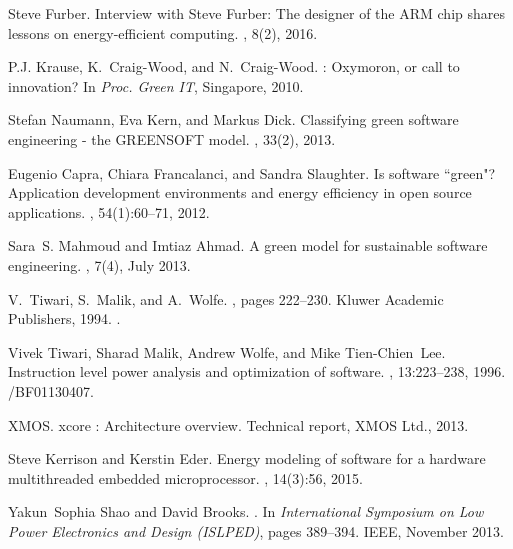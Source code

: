 \documentclass[oneside]{book}
\begin{document}

%
\begin{thebibliography}{10}

Steve Furber.
\newblock Interview with {S}teve {F}urber: The designer of the {ARM} chip
  shares lessons on energy-efficient computing.
, 8(2), 2016.

P.J. Krause, K.~Craig-Wood, and N.~Craig-Wood.
: {O}xymoron, or call to innovation?
\newblock In {\em Proc. Green IT}, Singapore, 2010.

Stefan Naumann, Eva Kern, and Markus Dick.
\newblock Classifying green software engineering - the {GREENSOFT} model.
, 33(2), 2013.

Eugenio Capra, Chiara Francalanci, and Sandra Slaughter.
\newblock Is software ``green"? {A}pplication development environments and
  energy efficiency in open source applications.
, 54(1):60--71, 2012.

Sara~S. Mahmoud and Imtiaz Ahmad.
\newblock A green model for sustainable software engineering.
, 7(4), July 2013.

V.~Tiwari, S.~Malik, and A.~Wolfe.
, pages 222--230.
\newblock Kluwer Academic Publishers, 1994.
.

Vivek Tiwari, Sharad Malik, Andrew Wolfe, and Mike Tien-Chien~Lee.
\newblock Instruction level power analysis and optimization of software.
, 13:223--238, 1996.
/BF01130407.

XMOS.
\newblock xcore : Architecture overview.
\newblock Technical report, XMOS Ltd., 2013.

Steve Kerrison and Kerstin Eder.
\newblock Energy modeling of software for a hardware multithreaded embedded
  microprocessor.
, 14(3):56, 2015.

Yakun~Sophia Shao and David Brooks.
.
\newblock In {\em International Symposium on Low Power Electronics and Design
  (ISLPED)}, pages 389--394. IEEE, November 2013.


\end{thebibliography}
\end{document}
